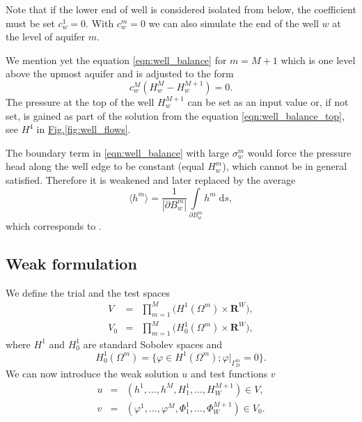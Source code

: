 \documentclass[preprint,12pt]{elsarticle}
\newcommand{\fig}[1]{\hyperref[#1]{Fig.\ref{#1}}}
\def\abs#1{\left|#1\right|}
\def\avg#1{\langle#1\rangle}
\def\abs#1{| #1 |}
\newcommand{\dd}{\; \mathrm{d}}
\newcommand{\R}{\mathbf{R}}
\begin{document}
Note that if the lower end of well is considered isolated from below, the coefficient must be set $c^1_w = 0$.
With $c^m_w = 0$ we can also simulate the end of the well $w$ at the level of aquifer $m$.

We mention yet the equation \eqref{eqn:well_balance} for $m=M+1$ which is one level above the upmost aquifer
and is adjusted to the form
\begin{equation} \label{eqn:well_balance_top}
  c^M_w\left( H^{M}_w-H^{M+1}_w \right) = 0.
\end{equation}
The pressure at the top of the well $H^{M+1}_w$ can be set as an input value or, if not set, is gained 
as part of the solution from the equation \eqref{eqn:well_balance_top}, see $H^4$ in \fig{fig:well_flows}.

The boundary term in \eqref{eqn:well_balance} with large $\sigma^m_w$ would force the pressure head along the 
well edge to be constant (equal $H^m_w$), which cannot be in general satisfied. Therefore it is weakened and 
later replaced by the average
\begin{equation} \label{eqn:average}
  \avg{h^m} = \frac{1}{\abs{\partial B^m_w}} \int\limits_{\partial B^m_w} h^m \dd s,
\end{equation}
which corresponds to \cite{gracie}.

\subsection{Weak formulation}
We define the trial and the test spaces
\begin{eqnarray} \label{eqn:spaces}
  V &=& \prod\limits_{m=1}^{M}\big(H^1(\Omega^m)\times\R^W\big), \\
  V_0 &=& \prod\limits_{m=1}^{M}\big(H^1_0(\Omega^m)\times\R^W\big),
\end{eqnarray}
where $H^1$ and $H^1_0$ are standard Sobolev spaces and 
\[ H^1_0(\Omega^m)=\{\varphi\in H^1(\Omega^m); \varphi|_{\Gamma^m_D}=0\}. \]
We can now introduce the weak solution $u$ and test functions $v$
\begin{eqnarray} \label{eqn:solution}
   u &=& (h^1,\ldots, h^M, H^1_1,\ldots,H^{M+1}_W)\in V, \\
   v &=& (\varphi^1,\ldots, \varphi^M, \Phi^1_1,\ldots,\Phi^{M+1}_W)\in V_0.
\end{eqnarray}
\end{document}
